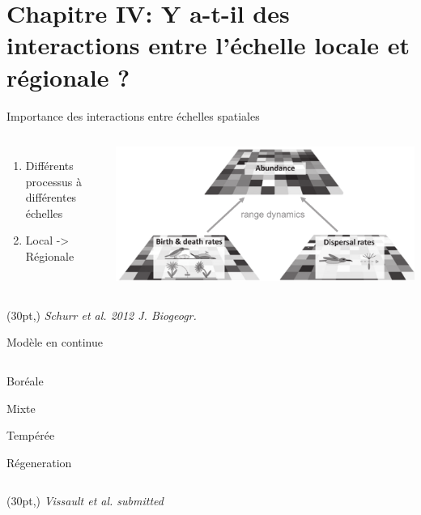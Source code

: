 \documentclass[11pt, compress, aspectratio=1610]{beamer}
\newcommand\smallcitation[1]{%
\begin{textblock*}{\textwidth}(30pt,\textheight)
	\raggedleft \footnotesize\textit{#1}
\end{textblock*}}
\providecommand{\tightlist}{%
  \setlength{\itemsep}{0pt}\setlength{\parskip}{0pt}}
\newcommand{\begincols}{\begin{columns}}
\newcommand{\stopcols}{\end{columns}}
\begin{document}
\section{Chapitre IV: Y a-t-il des interactions entre l'échelle locale
et régionale
?}\label{chapitre-iv-y-a-t-il-des-interactions-entre-luxe9chelle-locale-et-ruxe9gionale}

\begin{frame}{Importance des interactions entre échelles spatiales}

\begincols
{}

\begin{enumerate}
    \def\labelenumi{\arabic{enumi}.}
    \tightlist
    \item
      Différents processus à différentes échelles
    \item
      Local -> Régionale
  \end{enumerate}

\hfill{} \centering
 \includegraphics[scale=0.35]{figures/scaleInteg.pdf}\par
\stopcols
\smallcitation{Schurr et al. 2012 J. Biogeogr.}

\end{frame}

\begin{frame}{Modèle en continue}

\begincols
{} 
\hfill{}

\begin{description}
\tightlist
\item[B]
Boréale
\item[M]
Mixte
\item[T]
Tempérée
\item[R]
Régeneration
\end{description}

\stopcols

\smallcitation{Vissault et al. submitted}

\end{frame}
\end{document}
